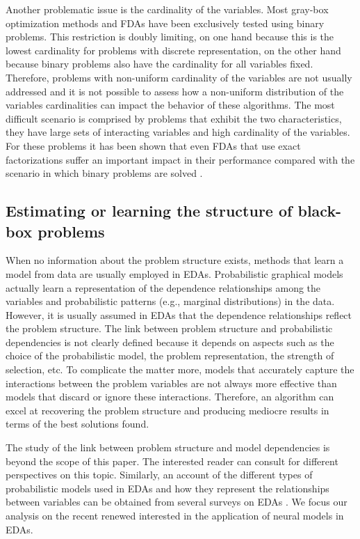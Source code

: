 \documentclass{article} %
\begin{document}
 Another problematic issue is the cardinality of the variables. Most gray-box optimization methods and FDAs have been exclusively tested using binary problems. This restriction is doubly limiting, on one hand because this is the lowest cardinality for problems with discrete representation, on the other hand because binary problems also have the cardinality for all variables fixed. Therefore, problems with non-uniform cardinality of the variables are not usually addressed and it is not possible to assess how a non-uniform distribution of the variables cardinalities can impact the behavior of these algorithms. The most difficult scenario is comprised by problems that exhibit the two characteristics, they have large sets of interacting variables and high cardinality of the variables. For these problems it has been shown that even FDAs that use exact factorizations suffer an important impact in their performance compared with the scenario in which binary problems are solved \cite{Santana_et_al:2009c}. 


\subsection{Estimating or learning the structure of black-box problems} 

 
 When no information about the problem structure exists, methods that learn  a model from data are usually employed in EDAs. Probabilistic graphical models actually learn a representation of the dependence relationships among the variables and probabilistic patterns (e.g., marginal distributions) in the data. However, it is usually assumed in EDAs that the dependence relationships reflect the problem structure. The link between problem structure and probabilistic dependencies is not clearly defined because it depends on aspects such as the choice of the probabilistic model, the problem representation, the strength of selection, etc.  To complicate the matter more, models that accurately capture the interactions between the problem variables are not always more effective than models that discard or ignore these interactions. Therefore, an algorithm can excel at recovering the problem structure and producing mediocre results in terms of the best solutions found.  

 The study of the link between problem structure and model dependencies is beyond the scope of this paper. The interested reader can consult \cite{Brownlee_et_al:2015,Brownlee_et_al:2012a,Brownlee_et_al:2009,Echegoyen_et_al:2011,Mishra_and_Gallagher:2012,Morgan_and_Gallagher:2012} for different perspectives on this topic. Similarly, an account of the different types of probabilistic models used in EDAs and how they represent the relationships between variables can be obtained from several surveys on EDAs \cite{Hauschild_and_Pelikan:2011,Larranaga_et_al:2012,Lozano_et_al:2005,Shakya_and_Santana:2012a}.  We focus our analysis on the recent renewed interested in the application of neural models in EDAs. 
\end{document}
